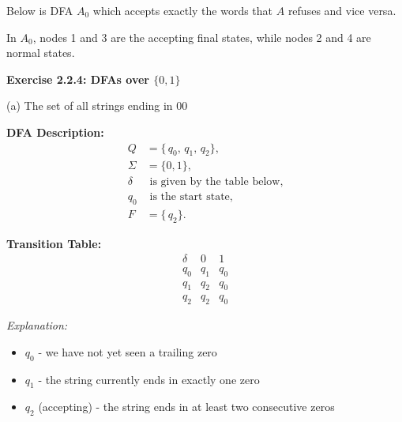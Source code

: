 \documentclass{article}
\theoremstyle{theorem}
\theoremstyle{definition}
\theoremstyle{remark}
\begin{document}
Below is DFA $A_0$ which accepts exactly the words that $A$ refuses and vice versa.
\begin{center}
\end{center}
In $A_0$, nodes 1 and 3 are the accepting final states, while nodes 2 and 4 are normal states.

\textbf{Exercise 2.2.4: DFAs over $\{0,1\}$}

{(a) The set of all strings ending in 00}

\noindent
\textbf{DFA Description:}
\[
\begin{aligned}
Q &= \{\,q_0,\, q_1,\, q_2\},\\
\Sigma &= \{0,1\},\\
\delta &\text{ is given by the table below},\\
q_0 &\text{ is the start state},\\
F &= \{\,q_2\}.
\end{aligned}
\]

\noindent
\textbf{Transition Table:}
\[
\begin{array}{c|cc}
  \delta & 0 & 1 \\
\hline
  q_0    & q_1 & q_0 \\
  q_1    & q_2 & q_0 \\
  q_2    & q_2 & q_0
\end{array}
\]

\noindent
\textit{Explanation:} 
\begin{itemize}
\item $q_0$ - we have not yet seen a trailing zero
\item $q_1$ - the string currently ends in exactly one zero
\item $q_2$ (accepting) - the string ends in at least two consecutive zeros
\end{itemize}
\end{document}

